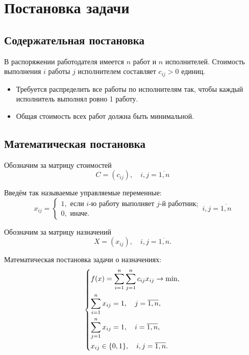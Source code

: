 \section{Постановка задачи}

\subsection{Содержательная постановка}

В распоряжении работодателя имеется $n$ работ и $n$ исполнителей.
Стоимость выполнения $i$ работы $j$ исполнителем составляет $c_{ij} > 0$ единиц.

\begin{itemize}
	\item Требуется распределить все работы по исполнителям так, чтобы каждый исполнитель выполнял ровно 1 работу.
	\item Общая стоимость всех работ должна быть минимальной.
\end{itemize}

\subsection{Математическая постановка}

Обозначим за матрицу стоимостей
\begin{equation}
	C = (c_{ij}), \quad i,j=\overline{1,n}
\end{equation}

Введём так называемые управляемые переменные:
\begin{equation}
	x_{ij} = \begin{cases}
		1, \text{ если } i \text{-ю работу выполняет } j \text{-й работник}; \\
		0, \text{ иначе}.
	\end{cases}
	i, j = \overline{1, n}
\end{equation}

Обозначим за матрицу назначений
\begin{equation}
	X = (x_{ij}), \quad  i, j = \overline{1, n}.
\end{equation}

Математическая постановка задачи о назначениях:
\begin{equation}
	\begin{dcases}
		f(x) = \sum_{i=1}^{n} \sum_{j=1}^n c_{ij}x_{ij} \to \min, \\
		\sum_{i=1}^{n} x_{ij} = 1, \quad j =\overline{1, n}, \\
		\sum_{j=1}^{n} x_{ij} = 1, \quad i =\overline{1, n}, \\
		x_{ij} \in \{0, 1\}, \quad i, j = \overline{1, n}. \\
	\end{dcases}
\end{equation}


